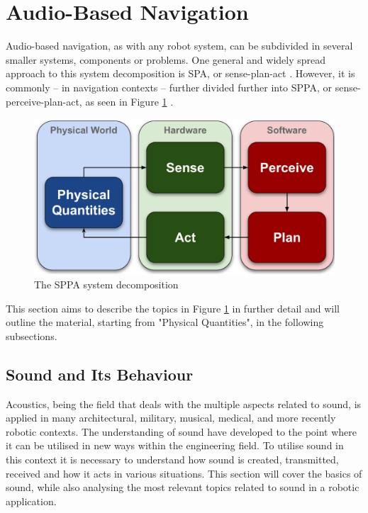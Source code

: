 \section{Audio-Based Navigation}\label{sec:AudioBasedNavigation}
Audio-based navigation, as with any robot system, can be subdivided in several smaller systems, components or problems. One general and widely spread approach to this system decomposition is SPA, or sense-plan-act \cite{AudioBasedNavigation:SensePlanAct}. However, it is commonly -- in navigation contexts -- further divided further into SPPA, or sense-perceive-plan-act, as seen in Figure \ref{fig:AutonomousNavigationOverview} \cite{AudioBasedNavigation:AutonomousNavigation}.

\begin{figure}[H]
    \centering
    \includegraphics[width=.8\textwidth]{figures/1Problem_analysis/Autonomous Navigation - Overview.pdf}
    \caption{The SPPA system decomposition}
    \label{fig:AutonomousNavigationOverview}
\end{figure}

This section aims to describe the topics in Figure \ref{fig:AutonomousNavigationOverview} in further detail and will outline the material, starting from "Physical Quantities", in the following subsections.

\subsection{Sound and Its Behaviour}\label{subsec:Sound}
Acoustics, being the field that deals with the multiple aspects related to sound, is applied in many architectural, military, musical, medical, and more recently robotic contexts. The understanding of sound have developed to the point where it can be utilised in new ways within the engineering field. To utilise sound in this context it is necessary to understand how sound is created, transmitted, received and how it acts in various situations. This section will cover the basics of sound, while also analysing the most relevant topics related to sound in a robotic application. \cite{Acoustics:Handbook_of_Acoustics}

